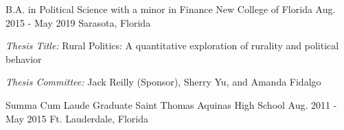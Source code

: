 

\begin{cventries}

  \cventry
    {B.A. in Political Science with a minor in Finance} %
    {New College of Florida} %
    {Aug. 2015 - May 2019} %
    {Sarasota, Florida} %
    {
    \begin{cvitems}
      \item \emph{Thesis Title:} Rural Politics: A quantitative exploration of rurality and political behavior
      \item \emph{Thesis Committee:} Jack Reilly (Sponsor), Sherry Yu, and Amanda Fidalgo
    \end{cvitems}
  }

  \cventry
    {Summa Cum Laude Graduate} %
    {Saint Thomas Aquinas High School} %
    {Aug. 2011 - May 2015} %
    {Ft. Lauderdale, Florida} %
    {}


\vspace{-.1cm}


\end{cventries}
